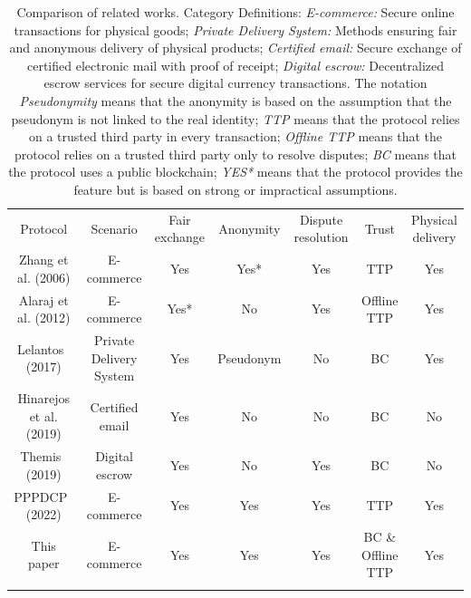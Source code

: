 \documentclass[pdftex,twocolumn,epjc3]{svjour3}
\begin{document}
\begin{table}
\centering
\newcommand{\YES}{\cellcolor{green!50}Yes}
\newcommand{\YESBUT}{\cellcolor{green!25}Yes*}
\newcommand{\ID}{\cellcolor{green!25}Identity}
\newcommand{\PSEUDO}{\cellcolor{green!35}Pseudonym}
\newcommand{\ANON}{\cellcolor{green!50}Anonymity}
\newcommand{\NO}{\cellcolor{red!50}No}
\newcommand{\TTP}{\cellcolor{red!50}TTP}
\newcommand{\OffTTP}{\cellcolor{orange!50}Offline TTP}
\newcommand{\OffBC}{\cellcolor{yellow!50}BC \& Offline TTP}
\newcommand{\BC}{\cellcolor{green!50}BC}
\caption{Comparison of related works. Category Definitions: \textit{E-commerce:} Secure online transactions for physical goods; \textit{Private Delivery System:} Methods ensuring fair and anonymous delivery of physical products; \textit{Certified email:} Secure exchange of certified electronic mail with proof of receipt; \textit{Digital escrow:} Decentralized escrow services for secure digital currency transactions. The notation \textit{Pseudonymity} means that the anonymity is based on the assumption that the pseudonym is not linked to the real identity; \textit{TTP} means that the protocol relies on a trusted third party in every transaction; \textit{Offline TTP} means that the protocol relies on a trusted third party only to resolve disputes; \textit{BC} means that the protocol uses a public blockchain; \textit{YES*} means that the protocol provides the feature but is based on strong or impractical assumptions.}
\label{tab:comparison}
\setlength{\tabcolsep}{3pt}

\begin{tabular}{ccccccc}

\noalign{\smallskip}\hline\noalign{\smallskip}
Protocol & Scenario & Fair exchange & Anonymity & Dispute resolution & Trust & Physical delivery \\
\noalign{\smallskip}\hline\noalign{\smallskip}
Zhang et al. \cite{zhangPracticalFairExchangeEPayment2006} (2006) & E-commerce & \YES & \YESBUT & \YES & \TTP & \YES  \\
Alaraj et al.\cite{mohammedalarajFairnessPhysicalProducts2012} (2012) & E-commerce & \YESBUT & \NO & \YES & \OffTTP & \YES \\
Lelantos~\cite{altawyLelantosBlockchainBasedAnonymous2017} (2017) & Private Delivery System & \YES & \PSEUDO & \NO & \BC & \YES \\
Hinarejos et al.\cite{hinarejosSolutionSecureCertified2019} (2019) & Certified email & \YES & \NO & \NO & \BC & \NO \\
Themis~\cite{mengThemisDecentralizedEscrow2019} (2019) & Digital escrow & \YES & \NO & \YES & \BC & \NO \\
PPPDCP~\cite{birjoveanuTwoPartyECommerceProtocols2022} (2022) & E-commerce & \YES & \YES & \YES & \TTP & \YES \\
This paper & E-commerce & \YES & \YES & \YES & \OffBC & \YES \\
\noalign{\smallskip}\hline

\end{tabular}

\end{table}
\end{document}
